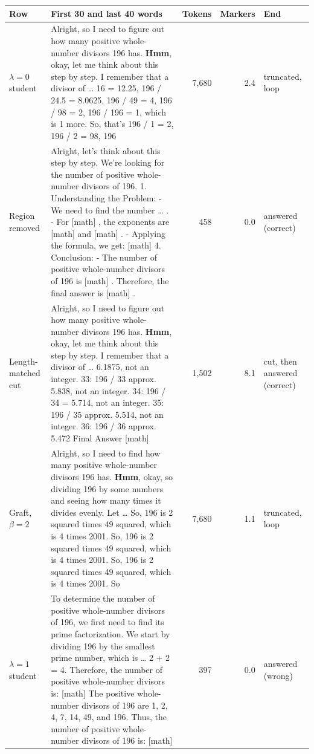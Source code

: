 \setlength{\tabcolsep}{3pt}\scriptsize
\begin{tabular}{@{}p{}p{}rrp{}@{}}
\toprule
Row & First 30 and last 40 words & Tokens & Markers & End \\
\midrule
$\lambda=0$ student & Alright, so I need to figure out how many positive whole-number divisors 196 has. \textbf{Hmm}, okay, let me think about this step by step. I remember that a divisor of \ldots{} 16 = 12.25, 196 / 24.5 = 8.0625, 196 / 49 = 4, 196 / 98 = 2, 196 / 196 = 1, which is 1 more. So, that's 196 / 1 = 2, 196 / 2 = 98, 196 & 7,680 & 2.4 & truncated, loop \\
\addlinespace
Region removed & Alright, let's think about this step by step. We're looking for the number of positive whole-number divisors of 196. 1. Understanding the Problem: - We need to find the number \ldots{} . - For [math] , the exponents are [math] and [math] . - Applying the formula, we get: [math] 4. Conclusion: - The number of positive whole-number divisors of 196 is [math] . Therefore, the final answer is [math] . & 458 & 0.0 & answered (correct) \\
\addlinespace
Length-matched cut & Alright, so I need to figure out how many positive whole-number divisors 196 has. \textbf{Hmm}, okay, let me think about this step by step. I remember that a divisor of \ldots{} 6.1875, not an integer. 33: 196 / 33 approx. 5.838, not an integer. 34: 196 / 34 = 5.714, not an integer. 35: 196 / 35 approx. 5.514, not an integer. 36: 196 / 36 approx. 5.472 Final Answer [math] & 1,502 & 8.1 & cut, then answered (correct) \\
\addlinespace
Graft, $\beta=2$ & Alright, so I need to find how many positive whole-number divisors 196 has. \textbf{Hmm}, okay, so dividing 196 by some numbers and seeing how many times it divides evenly. Let \ldots{} So, 196 is 2 squared times 49 squared, which is 4 times 2001. So, 196 is 2 squared times 49 squared, which is 4 times 2001. So, 196 is 2 squared times 49 squared, which is 4 times 2001. So & 7,680 & 1.1 & truncated, loop \\
\addlinespace
$\lambda=1$ student & To determine the number of positive whole-number divisors of 196, we first need to find its prime factorization. We start by dividing 196 by the smallest prime number, which is \ldots{} 2 + 2 = 4. Therefore, the number of positive whole-number divisors is: [math] The positive whole-number divisors of 196 are 1, 2, 4, 7, 14, 49, and 196. Thus, the number of positive whole-number divisors of 196 is: [math] & 397 & 0.0 & answered (wrong) \\

\end{tabular}
